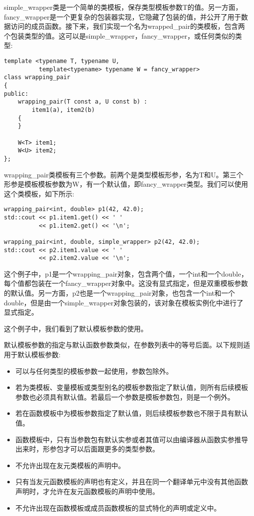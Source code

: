 simple\_wrapper类是一个简单的类模板，保存类型模板参数T的值。另一方面，fancy\_wrapper是一个更复杂的包装器实现，它隐藏了包装的值，并公开了用于数据访问的成员函数。接下来，我们实现一个名为wrapped\_pair的类模板，包含两个包装类型的值。这可以是simple\_wrapper，fancy\_wrapper，或任何类似的类型:

\begin{lstlisting}[style=styleCXX]
template <typename T, typename U,
		  template<typename> typename W = fancy_wrapper>
class wrapping_pair
{
public:
	wrapping_pair(T const a, U const b) :
		item1(a), item2(b)
	{
	}

	W<T> item1;
	W<U> item2;
};
\end{lstlisting}

wrapping\_pair类模板有三个参数。前两个是类型模板形参，名为T和U。第三个形参是模板模板参数为W，有一个默认值，即fancy\_wrapper类型。我们可以使用这个类模板，如下所示:

\begin{lstlisting}[style=styleCXX]
wrapping_pair<int, double> p1(42, 42.0);
std::cout << p1.item1.get() << ' '
		  << p1.item2.get() << '\n';

wrapping_pair<int, double, simple_wrapper> p2(42, 42.0);
std::cout << p2.item1.value << ' '
		  << p2.item2.value << '\n';
\end{lstlisting}

这个例子中，p1是一个wrapping\_pair对象，包含两个值，一个int和一个double，每个值都包装在一个fancy\_wrapper对象中。这没有显式指定，但是双重模板参数的默认值。另一方面，p2也是一个wrapping\_pair对象，也包含一个int和一个double，但是由一个simple\_wrapper对象包装的，该对象在模板实例化中进行了显式指定。

这个例子中，我们看到了默认模板参数的使用。


默认模板参数的指定与默认函数参数类似，在参数列表中的等号后面。以下规则适用于默认模板参数:

\begin{itemize}
\item 
可以与任何类型的模板参数一起使用，参数包除外。

\item 
若为类模板、变量模板或类型别名的模板参数指定了默认值，则所有后续模板参数也必须具有默认值。若最后一个参数是模板参数包，则是一个例外。

\item 
若在函数模板中为模板参数指定了默认值，则后续模板参数也不限于具有默认值。

\item 
函数模板中，只有当参数包有默认实参或者其值可以由编译器从函数实参推导出来时，形参包才可以后面跟更多的类型参数。

\item 
不允许出现在友元类模板的声明中。

\item 
只有当友元函数模板的声明也有定义，并且在同一个翻译单元中没有其他函数声明时，才允许在友元函数模板的声明中使用。

\item 
不允许出现在函数模板或成员函数模板的显式特化的声明或定义中。
\end{itemize}


